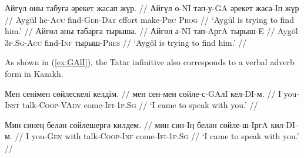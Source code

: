 \documentclass[a4paper,11pt]{article}
\newcommand{\gmk}[1]{{\qipb\scshape #1}}
\newcommand{\eng}[1]{`#1'}
\begin{document}

\pex[everygla=,everyglb=,everyglc=\small,aboveglbskip=0pt,aboveglftskip=0ex]  %
\vspace{-1ex}
\label{ex:try}
\begingl
\gla Айгүл оны табуға әрекет жасап жүр. //
\glb Айгүл о-NI тап-у-GA әрекет жаса-Iп жүр //
\glc Aygül he-\gmk{Acc} find-\gmk{Ger}-\gmk{Dat} effort make-\gmk{Prc} \gmk{Prog} //
\glft \eng{Aygül is trying to find him.} //
\endgl
\xe
\pex[everygla=,everyglb=,everyglc=,aboveglbskip=0pt,aboveglftskip=0ex]  %
\vspace{-1ex}
\begingl
\gla Айгөл аны табарга тырыша. //
\glb Айгөл а-NI тап-AргA тырыш-E //
\glb Aygöl \gmk{3p.Sg}-\gmk{Acc} find-\gmk{Inf} тырыш-\gmk{Pres} //
\glft \eng{Aygöl is trying to find him.} //
\endgl
\xe

\vspace{1ex}
As shown in (\ref{ex:GAlI}), the Tatar infinitive also corresponds to a verbal adverb form in Kazakh.

\pex[everygla=,everyglb=,everyglc=,aboveglbskip=0pt,aboveglftskip=0ex]  %
\vspace{-1ex}
\label{ex:GAlI}
\begingl
\gla Мен сенімен сөйлескелі келдім. //
\glb мен сен-мен сөйле-с-GAлI кел-DI-м. //
\glb I you-\gmk{Inst} talk-\gmk{Coop}-\gmk{VAdv} come-\gmk{Ifi}-\gmk{1p.Sg} //
\glft \eng{I came to speak with you.} //
\endgl
\xe


\pex[everygla=,everyglb=,everyglc=\small,aboveglbskip=0pt,aboveglftskip=0ex]  %
\vspace{-1ex}
\begingl
\gla Мин синең белән сөйлешергә килдем. //
\glb мин син-Iң белән сөйле-ш-IргA кил-DI-м. //
\glc I you-\gmk{Gen} with talk-\gmk{Coop}-\gmk{Inf} come-\gmk{Ifi}-\gmk{1p.Sg} //
\glft \eng{I came to speak with you.} //
\endgl
\xe
\end{document}
